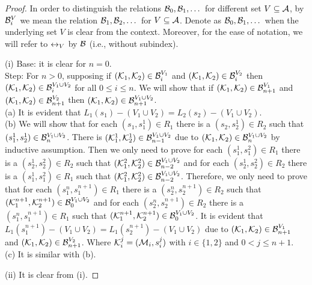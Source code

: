 \documentclass{article}
\begin{document}
 \begin{proof}
 In order to distinguish the relations ${\cal B}_0, {\cal B}_1, \dots$ for different set $V \subseteq {\cal A}$, by ${\cal B}_i^V$ we mean the relation ${\cal B}_1, {\cal B}_2, \dots$ for $V \subseteq {\cal A}$.
 Denote as ${\cal B}_0, {\cal B}_1, \dots$ when the underlying set $V$ is clear from the context. Moreover, for the ease of notation, we will refer to $\leftrightarrow_V$ by ${\cal B}$ (i.e., without subindex).

 (i) Base: it is clear for $n = 0$.\\
 Step: For $n > 0$, supposing if $({\cal K}_1, {\cal K}_2) \in {\cal B}_i^{V_1}$ and $({\cal K}_1, {\cal K}_2) \in {\cal B}_i^{V_2}$ then $({\cal K}_1, {\cal K}_2) \in {\cal B}_i^{V_1 \cup V_2}$ for all $0 \leq i \leq n$. We will show that if $({\cal K}_1, {\cal K}_2) \in {\cal B}_{n+1}^{V_1}$ and $({\cal K}_1, {\cal K}_2) \in {\cal B}_{n+1}^{V_2}$ then $({\cal K}_1, {\cal K}_2) \in {\cal B}_{n+1}^{V_1 \cup V_2}$.\\
 (a) It is evident that $L_1(s_1) - (V_1 \cup V_2) = L_2(s_2) - (V_1\cup V_2)$.\\
 (b) We will show that for each $(s_1, s_1^1) \in R_1$ there is a $(s_2, s_2^1) \in R_2$ such that $(s_1^1, s_2^1) \in {\cal B}_n^{V_1 \cup V_2}$. There is $({\cal K}_1^1, {\cal K}_2^1) \in {\cal B}_{n-1}^{V_1 \cup V_2}$
 due to $({\cal K}_1, {\cal K}_2) \in {\cal B}_n^{V_1 \cup V_2}$ by inductive assumption. Then we only need to prove for each $(s_1^1, s_1^2) \in R_1$ there is a $(s_2^1, s_2^2) \in R_2$ such that $({\cal K}_1^2, {\cal K}_2^2) \in {\cal B}_{n-2}^{V_1 \cup V_2}$ and for each $(s_2^1, s_2^2) \in R_2$ there is a $(s_1^1, s_1^2) \in R_1$ such that $({\cal K}_1^2, {\cal K}_2^2) \in {\cal B}_{n-2}^{V_1 \cup V_2}$. Therefore, we only need to prove that for each $(s_1^n, s_1^{n+1}) \in R_1$ there is a $(s_2^n, s_2^{n+1}) \in R_2$ such that $({\cal K}_1^{n+1}, {\cal K}_2^{n+1}) \in {\cal B}_0^{V_1 \cup V_2}$ and for each $(s_2^n, s_2^{n+1}) \in R_2$ there is a $(s_1^n, s_1^{n+1}) \in R_1$ such that $({\cal K}_1^{n+1}, {\cal K}_2^{n+1}) \in {\cal B}_0^{V_1 \cup V_2}$. It is evident that $L_1(s_1^{n+1}) - (V_1 \cup V_2) = L_1(s_2^{n+1}) - (V_1 \cup V_2)$ due to $({\cal K}_1, {\cal K}_2) \in {\cal B}_{n+1}^{V_1}$ and $({\cal K}_1, {\cal K}_2) \in {\cal B}_{n+1}^{V_2}$.
 Where ${\cal K}_i^j = ({\cal M}_i, s_i^j)$ with $i \in \{1, 2\}$ and $0 < j \leq n+1$.\\
 (c) It is similar with (b).

 (ii) It is clear from (i).


\end{proof}
\end{document}

